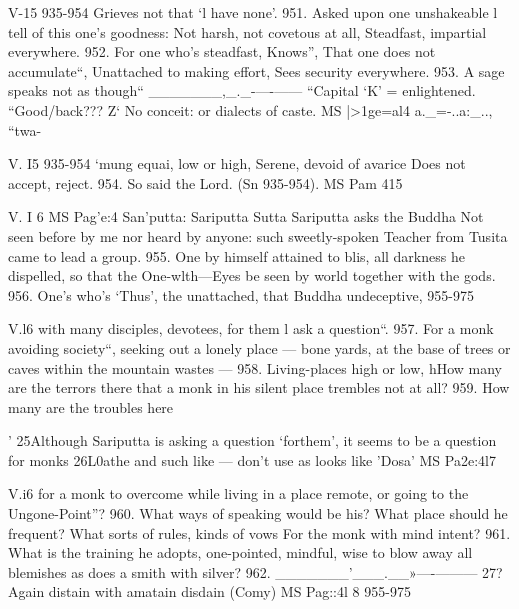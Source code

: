    
   
   V-15 935-954
   Grieves not that `l have none'.
   951.
   Asked upon one unshakeable
   l tell of this one's goodness:
   Not harsh, not covetous at all,
   Steadfast, impartial everywhere.
   952.
   For one who's steadfast, Knows”,
   That one does not accumulate“,
   Unattached to making effort,
   Sees security everywhere.
   953.
   A sage speaks not as though“
   _______,_._-—-——
   “Capital `K' = enlightened.
   “Good/back???
   Z` No conceit: or dialects of caste.
   MS |>1ge=al4
   a._=-..a:_.., “twa-
   
   
   
   V. I5 935-954
   `mung equai, low or high,
   Serene, devoid of avarice
   Does not accept, reject.
   954.
   So said the Lord.
   (Sn 935-954).
   MS Pam 415
      

  

   
   
  
   
   
   
   V. I 6
   MS Pag'e:4\6
   San'putta:
   Sariputta Sutta
   Sariputta asks the Buddha
   Not seen before by me
   nor heard by anyone:
   such sweetly-spoken Teacher
   from Tusita came to lead a group.
   955.
   One by himself attained to blis,
   all darkness he dispelled,
   so that the One-wlth—Eyes be seen
   by world together with the gods.
   956.
   One's who's `Thus', the unattached,
   that Buddha undeceptive,
   955-975
   
   
   
   V.l6
   with many disciples, devotees,
   for them l ask a question“.
   957.
   For a monk avoiding society“,
   seeking out a lonely place —
   bone yards, at the base of trees
   or caves within the mountain wastes —
   958.
   Living-places high or low,
   hHow many are the terrors there
   that a monk in his silent place
   trembles not at all?
   959.
   How many are the troubles here
    
   ' 25Although Sariputta is asking a question `forthem', it seems to be a question for monks
   26L0athe and such like — don't use as looks like 'Dosa'
   MS Pa2e:4l7
   
   
   
   V.i6
   for a monk to overcome
   while living in a place remote,
   or going to the Ungone-Point”?
   960.
   What ways of speaking would be his?
   What place should he frequent?
   What sorts of rules, kinds of vows
   For the monk with mind intent?
   961.
   What is the training he adopts,
   one-pointed, mindful, wise
   to blow away all blemishes
   as does a smith with silver?
   962.
   _______'___.__»—-———
   27? Again distain with amatain disdain (Comy)
   MS Pag::4l 8
   955-975
   
